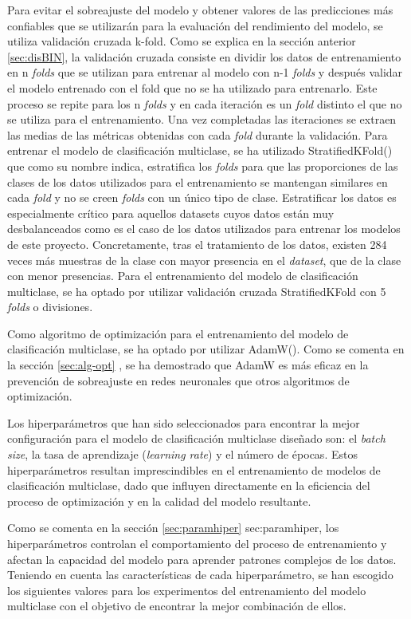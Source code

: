 Para evitar el sobreajuste del modelo y obtener valores de las predicciones más confiables que se utilizarán para la evaluación del rendimiento del modelo, se utiliza validación cruzada k-fold. Como se explica en la sección anterior \ref{sec:disBIN}, la validación cruzada consiste en dividir los datos de entrenamiento en n \textit{folds} que se utilizan para entrenar al modelo con n-1 \textit{folds} y después validar el modelo entrenado con el fold que no se ha utilizado para entrenarlo. Este proceso se repite para los n \textit{folds} y en cada iteración es un \textit{fold} distinto el que no se utiliza para el entrenamiento. Una vez completadas las iteraciones se extraen las medias de las métricas obtenidas con cada \textit{fold} durante la validación. Para entrenar el modelo de clasificación multiclase, se ha utilizado StratifiedKFold() que como su nombre indica, estratifica los \textit{folds} para que las proporciones de las clases de los datos utilizados para el entrenamiento se mantengan similares en cada \textit{fold} y no se creen \textit{folds} con un único tipo de clase. Estratificar los datos es especialmente crítico para aquellos datasets cuyos datos están muy desbalanceados como es el caso de los datos utilizados para entrenar los modelos de este proyecto. Concretamente, tras el tratamiento de los datos, existen 284 veces más muestras de la clase con mayor presencia en el \textit{dataset}, que de la clase con menor presencias. Para el entrenamiento del modelo de clasificación multiclase, se ha optado por utilizar validación cruzada StratifiedKFold con 5 \textit{folds} o divisiones.

Como algoritmo de optimización para el entrenamiento del modelo de clasificación multiclase, se ha optado por utilizar AdamW(). Como se comenta en la sección \ref{sec:alg-opt} , se ha demostrado que AdamW es más eficaz en la prevención de sobreajuste en redes neuronales que otros algoritmos de optimización.

Los hiperparámetros que han sido seleccionados para encontrar la mejor configuración para el modelo de clasificación multiclase diseñado son: el \textit{batch size}, la tasa de aprendizaje (\textit{learning rate}) y el número de épocas. Estos hiperparámetros resultan imprescindibles en el entrenamiento de modelos de clasificación multiclase, dado que influyen directamente en la eficiencia del proceso de optimización y en la calidad del modelo resultante.

Como se comenta en la sección \ref{sec:paramhiper} \refname{sec:paramhiper}, los hiperparámetros controlan el comportamiento del proceso de entrenamiento y afectan la capacidad del modelo para aprender patrones complejos de los datos. Teniendo en cuenta las características de cada hiperparámetro, se han escogido los siguientes valores para los experimentos del entrenamiento del modelo multiclase con el objetivo de encontrar la mejor combinación de ellos.

